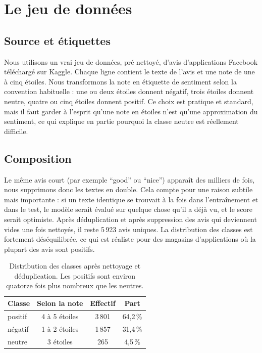 \documentclass[11pt,a4paper]{article}
\begin{document}
\section{Le jeu de données}
\subsection{Source et étiquettes}
Nous utilisons un vrai jeu de données, pré nettoyé, d'avis d'applications Facebook
téléchargé sur Kaggle. Chaque ligne contient le texte de l'avis et une note de une à
cinq étoiles. Nous transformons la note en étiquette de sentiment selon la convention
habituelle : une ou deux étoiles donnent négatif, trois étoiles donnent neutre, quatre
ou cinq étoiles donnent positif. Ce choix est pratique et standard, mais il faut garder
à l'esprit qu'une note en étoiles n'est qu'une approximation du sentiment, ce qui
explique en partie pourquoi la classe neutre est réellement difficile.

\subsection{Composition}
Le même avis court (par exemple ``good'' ou ``nice'') apparaît des milliers de fois,
nous supprimons donc les textes en double. Cela compte pour une raison subtile mais
importante : si un texte identique se trouvait à la fois dans l'entraînement et dans le
test, le modèle serait évalué sur quelque chose qu'il a déjà vu, et le score serait
optimiste. Après déduplication et après suppression des avis qui deviennent vides une
fois nettoyés, il reste 5\,923 avis uniques. La distribution des classes est fortement
déséquilibrée, ce qui est réaliste pour des magasins d'applications où la plupart des
avis sont positifs.

\begin{table}[H]
\centering
\begin{tabular}{lccc}
\toprule
\textbf{Classe} & \textbf{Selon la note} & \textbf{Effectif} & \textbf{Part} \\
\midrule
positif & 4 à 5 étoiles & 3\,801 & 64,2\,\% \\
négatif & 1 à 2 étoiles & 1\,857 & 31,4\,\% \\
neutre  & 3 étoiles     & 265    & 4,5\,\% \\
\bottomrule
\end{tabular}
\caption{Distribution des classes après nettoyage et déduplication. Les positifs sont
environ quatorze fois plus nombreux que les neutres.}
\end{table}
\end{document}
